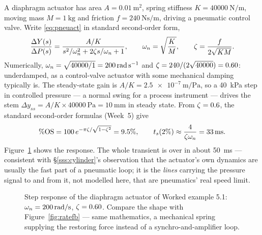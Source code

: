\documentclass[11pt,a4paper]{article}
\begin{document}
\begin{workedex}[breakable, title={Worked example 5.1 --- sizing a diaphragm actuator's response}]
A diaphragm actuator has area $A=\SI{0.01}{\metre\squared}$, spring stiffness
$K=\SI{40000}{\newton\per\metre}$, moving mass $M=\SI{1}{\kilo\gram}$ and
friction $f=\SI{240}{\newton\second\per\metre}$, driving a pneumatic control
valve. Write \eqref{eq:pneuact} in standard second-order form,
\[
  \frac{\Delta Y(s)}{\Delta P(s)}=\frac{A/K}{s^{2}/\omega_{n}^{2}+2\zeta s/\omega_{n}+1},
  \qquad
  \omega_{n}=\sqrt{\frac{K}{M}}, \qquad \zeta=\frac{f}{2\sqrt{KM}}.
\]
Numerically, $\omega_{n}=\sqrt{40000/1}=\SI{200}{\radian\per\second}$ and
$\zeta=240/(2\sqrt{40000})=0.60$: underdamped, as a control-valve actuator with
some mechanical damping typically is. The steady-state gain is
$A/K=\SI{2.5e-7}{\metre\per\pascal}$, so a \SI{40}{\kilo\pascal} step in
controlled pressure --- a normal swing for a process instrument --- drives the
stem $\Delta y_{ss}=A/K\times\SI{40000}{\pascal}=\SI{10}{\milli\metre}$ in
steady state. From $\zeta=0.6$, the standard second-order formulas (Week~5)
give
\[
  \%\text{OS}=100\,e^{-\pi\zeta/\sqrt{1-\zeta^{2}}}=9.5\%,
  \qquad
  t_{s}(2\%)\approx\frac{4}{\zeta\omega_{n}}=\SI{33}{\milli\second}.
\]
Figure~\ref{fig:diaphragmstep} shows the response. The whole transient is
over in about \SI{50}{\milli\second} --- consistent with \S\ref{sss:cylinder}'s
observation that the actuator's own dynamics are usually the fast part of a
pneumatic loop; it is the \emph{lines} carrying the pressure signal to and
from it, not modelled here, that are pneumatics' real speed limit.

\begin{figure}[H]
\centering
{}
\caption{Step response of the diaphragm actuator of Worked example 5.1:
$\omega_{n}=\SI{200}{rad/s}$, $\zeta=0.60$. Compare the shape with
Figure~\ref{fig:ratefb} --- same mathematics, a mechanical spring supplying
the restoring force instead of a synchro-and-amplifier loop.}
\label{fig:diaphragmstep}
\end{figure}
\end{workedex}
\end{document}
